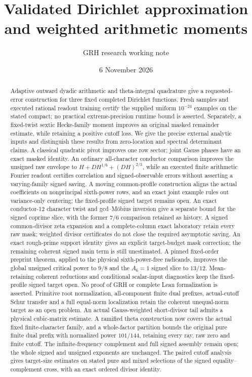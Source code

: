 \documentclass[11pt]{article}
\title{Validated Dirichlet approximation and weighted arithmetic moments}
\author{GRH research working note}
\date{6 November 2026}
\begin{document}
\maketitle
\begin{abstract}Adaptive outward dyadic arithmetic and theta-integral quadrature give a requested-error construction for three fixed completed Dirichlet functions. Fresh samples and executed rational readout training certify the supplied uniform $10^{-24}$ examples on the stated compact; no practical extreme-precision runtime bound is asserted. Separately, a fixed-twist sextic Hecke-family moment improves an original masked remainder estimate, while retaining a positive cutoff loss. We give the precise external analytic inputs and distinguish these results from zero-location and spectral determinant claims. A classical quadratic pivot improves one row sector; joint Gauss phases have an exact masked identity. An ordinary all-character conductor comparison improves the unsigned raw envelope to $H+DH^{1/6}+(DH)^{2/3}$, while an executed finite arithmetic Fourier readout certifies correlation and signed-observable errors without asserting a varying-family signed saving. A moving common-profile construction aligns the actual coefficients on nonprincipal sixth-power rows, and an exact joint example rules out variance-only centering; the fixed-profile signed target remains open. An exact conductor-12 character twist and gcd--M\"obius inversion give a separate bound for the signed coprime slice, with the former $7/6$ comparison retained as history. A signed common-divisor zeta expansion and a complete-column exact laboratory retain every raw mask; weighted divisor certificates do not close the required asymptotic saving. An exact rough-prime support identity gives an explicit target-budget mask correction; the remaining coherent signed main term is still unestimated. A pinned fixed-order preprint theorem, applied to the physical sixth-power-free radicands, improves the global unsigned critical power to $9/8$ and the $A_6=1$ signed slice to $13/12$. Mean-retaining coherent reductions and conditional scalar-input diagnostics keep the fixed-profile signed target open. No proof of GRH or complete Lean formalization is asserted. Primitive root normalization, all-component finite dual prefixes, actual-cutoff Schur transfer and a full equal-norm localization retain the coherent unequal-norm target as an open problem. An actual Gauss-weighted short-divisor tail admits a physical cubic-matrix estimate. A ramified theta construction now covers the actual fixed finite-character family, and a whole-factor partition bounds the original pure finite dual prefix with normalized power $101/144$, retaining every ray, raw zero and finite cutoff. The infinite-frequency complement and full signed assembly remain open; the whole signed and unsigned exponents are unchanged.
 The paired cutoff analysis gives target-size estimates on stated pure and mixed selections of the signed equality--complement cross, with an exact ordered divisor identity.
\end{abstract}
\end{document}
